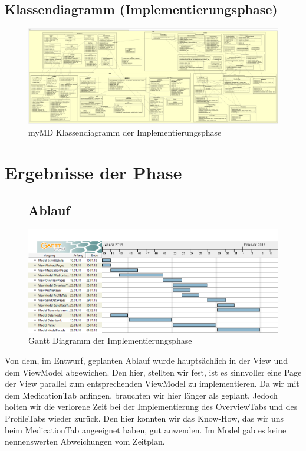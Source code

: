 \documentclass[a4paper]{scrreprt}
\begin{document}
\section{Klassendiagramm (Implementierungsphase)}
\begin{figure}[H]
\hspace{-1.8cm}
\begin{minipage}[c]{\textwidth}
\centering
\includegraphics[width=1.7\textwidth, angle=90]{graphics/Klassendiagramme/myMDImplementierung}
\caption{myMD Klassendiagramm der Implementierungsphase}
\end{minipage}
\end{figure}

\chapter{Ergebnisse der Phase}
\begin{figure}[H]
\section{Ablauf}
\begin{minipage}[c]{\textwidth}
\centering
\includegraphics[width=0.95\textheight, angle=90]{Gantt/GanttDiagrammImplementierung}
\caption{Gantt Diagramm der Implementierungsphase}
\end{minipage}
\end{figure}
Von dem, im Entwurf, geplanten Ablauf wurde hauptsächlich in der View und dem ViewModel abgewichen. Den hier, stellten wir fest, ist es sinnvoller eine Page der View parallel zum entsprechenden ViewModel zu implementieren. Da wir mit dem MedicationTab anfingen, brauchten wir hier länger als geplant. Jedoch holten wir die verlorene Zeit bei der Implementierung des OverviewTabs und des ProfileTabs wieder zurück. Den hier konnten wir das Know-How, das wir uns beim MedicationTab angeeignet haben, gut anwenden.
Im Model gab es keine nennenswerten Abweichungen vom Zeitplan.
\end{document}
